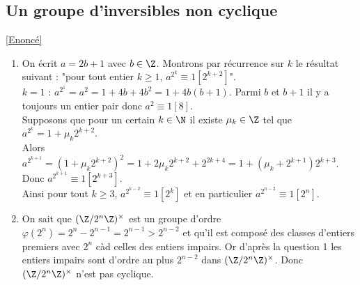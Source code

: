\documentclass[8pt]{book}
\begin{document}
	\subsection{Un groupe d'inversibles non cyclique }
	\label{Un groupe d'inversibles non cyclique corrigé}
	\textcolor{blue}{\hyperref[Un groupe d'inversibles non cyclique]{[Enoncé]}}\\
	\begin{enumerate}[leftmargin=*]
		\item On écrit $a=2b+1$ avec $b\in \Z$. Montrons par récurrence sur $k$ le résultat suivant : "pour tout entier $k\geq 1$, $a^{2^k}\equiv 1[2^{k+2}]$".\\
		$k=1$ : $a^{2^1}=a^2=1+4b+4b^2=1+4b(b+1)$. Parmi $b$ et $b+1$ il y a toujours un entier pair donc $a^2\equiv 1[8]$.\\
		Supposons que pour un certain $k\in \N$ il existe $\mu_k\in \Z$ tel que $a^{2^k}=1+\mu_k2^{k+2}$.\\
		Alors $a^{2^{k+1}}=(1+\mu_k2^{k+2})^2=1+2\mu_k2^{k+2}+2^{2k+4}=1+(\mu_k+2^{k+1})2^{k+3}$.\\
		Donc $a^{2^{k+1}}\equiv 1[2^{k+3}]$.\\
		Ainsi pour tout $k\geq 3$, $a^{2^{k-2}}\equiv 1[2^k]$ et en particulier $a^{2^{n-2}}\equiv 1[2^n]$.
		\item On sait que $(\Z/2^n\Z)^\times$ est un groupe d'ordre $\varphi(2^n)=2^n-2^{n-1}=2^{n-1}>2^{n-2}$ et qu'il est composé des classes d'entiers premiers avec $2^n$ càd celles des entiers impairs. Or d'après la question 1 les entiers impairs sont d'ordre au plus $2^{n-2}$ dans $(\Z/2^n\Z)^\times$. Donc $(\Z/2^n\Z)^\times$ n'est pas cyclique.
	\end{enumerate}
	
\end{document}
